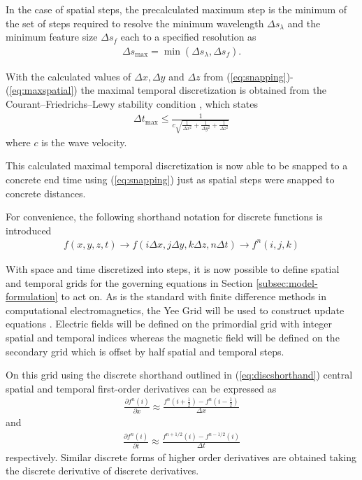 In the case of spatial steps, the precalculated maximum step is the minimum of the set of steps required to resolve the minimum wavelength $\Delta s_\lambda$ and the minimum feature size $\Delta s_f$ each to a specified resolution as
\begin{align}
	\Delta s_{\max} = \min{(\Delta s_\lambda, \Delta s_f)}.
	\label{eq:maxspatial}
\end{align}

With the calculated values of $\Delta x, \Delta y$ and $\Delta z$ from  (\ref{eq:snapping})-(\ref{eq:maxspatial}) the maximal temporal discretization is obtained from the Courant–Friedrichs–Lewy stability condition \cite{jin2011theory}, which states
\begin{align}
	\Delta t_{\max} \leq \frac{1}{c\sqrt{\frac{1}{\Delta x^2}+\frac{1}{\Delta y^2}+\frac{1}{\Delta z^2}}}
\end{align}
where $c$ is the wave velocity.

This calculated maximal temporal discretization is now able to be snapped to a concrete end time using  (\ref{eq:snapping}) just as spatial steps were snapped to concrete distances.

For convenience, the following shorthand notation for discrete functions is introduced
\begin{align}
	f(x,y,z,t)\rightarrow f(i\Delta x, j\Delta y, k\Delta z, n\Delta t)\rightarrow f^n(i,j,k)
	\label{eq:discshorthand}
\end{align}

With space and time discretized into steps, it is now possible to define spatial and temporal grids for the governing equations in Section \ref{subsec:model-formulation} to act on. As is the standard with finite difference methods in computational electromagnetics, the Yee Grid will be used to construct update equations \cite{taftlovefdtd}. Electric fields will be defined on the primordial grid with integer spatial and temporal indices whereas the magnetic field will be defined on the secondary grid which is offset by half spatial and temporal steps.

On this grid using the discrete shorthand outlined in  (\ref{eq:discshorthand}) central spatial and temporal first-order derivatives can be expressed as
\begin{align}
	\frac{\partial f^n(i)}{\partial x} \approx \frac{f^n(i+\frac{1}{2})- f^n(i-\frac{1}{2})}{\Delta x}
	\label{eq:derivspace}
\end{align}
and
\begin{align}
	\frac{\partial f^n(i)}{\partial t} \approx \frac{f^{n+1/2}(i)- f^{n-1/2}(i)}{\Delta t}
	\label{eq:derivtime}
\end{align}
respectively. Similar discrete forms of higher order derivatives are obtained taking the discrete derivative of discrete derivatives.

